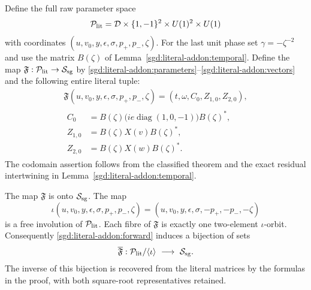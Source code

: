 Define the full raw parameter space
\[
 \mathcal P_{\rm lit}
 =\mathcal D\times\{1,-1\}^2\times U(1)^2\times U(1)
\]
with coordinates $(u,v_0,y,\epsilon,\sigma,p_+,p_-,\zeta)$.
For the last unit phase set $\gamma=-\zeta^{-2}$ and use the
matrix $B(\zeta)$ of Lemma~\ref{sgd:literal-addon:temporal}.
Define the map $\mathfrak F:\mathcal P_{\rm lit}\to\mathcal S_{\rm sg}$
by \eqref{sgd:literal-addon:parameters}--\eqref{sgd:literal-addon:vectors}
and the following entire literal tuple:
\begin{equation}
 \begin{gathered}
 \mathfrak F(u,v_0,y,\epsilon,\sigma,p_+,p_-,\zeta)
 =(t,\omega,C_0,Z_{1,0},Z_{2,0}),\\
 \begin{aligned}
 C_0&=B(\zeta)\bigl(ie\operatorname{diag}(1,0,-1)\bigr)B(\zeta)^*,\\
 Z_{1,0}&=B(\zeta)X(v)B(\zeta)^*,\\
 Z_{2,0}&=B(\zeta)X(w)B(\zeta)^*.
 \end{aligned}
 \end{gathered}
 \label{sgd:literal-addon:forward}
\end{equation}
The codomain assertion follows from the classified theorem and the
exact residual intertwining in Lemma~\ref{sgd:literal-addon:temporal}.

\begin{theorem}
\label{sgd:literal-addon:quotient}
The map $\mathfrak F$ is onto $\mathcal S_{\rm sg}$.
The map
\begin{equation}
 \iota(u,v_0,y,\epsilon,\sigma,p_+,p_-,\zeta)
 =(u,v_0,y,\epsilon,\sigma,-p_+,-p_-,-\zeta)
 \label{sgd:literal-addon:involution}
\end{equation}
is a free involution of $\mathcal P_{\rm lit}$.
Each fibre of $\mathfrak F$ is exactly one two-element
$\iota$-orbit. Consequently \eqref{sgd:literal-addon:forward}
induces a bijection of sets
\begin{equation}
 \overline{\mathfrak F}:
 \mathcal P_{\rm lit}/\langle\iota\rangle
 \ \longrightarrow\ \mathcal S_{\rm sg}.
 \label{sgd:literal-addon:bijection}
\end{equation}
The inverse of this bijection is recovered from the literal matrices
by the formulas in the proof, with both square-root representatives
retained.
\end{theorem}

